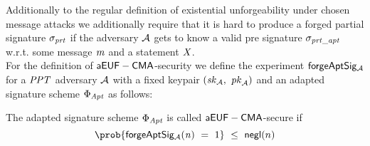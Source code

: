 \begin{definition}[$\cnstaEUFCMA$]\label{def:aeufcma}
Additionally to the regular definition of existential unforgeability under chosen message attacks we additionally require that it is hard to produce a forged partial signature $\sigma_{\mathit{prt}}$ if the
adversary $\mathcal{A}$ gets to know a valid pre signature $\sigma_{\mathit{prt\_apt}}$ w.r.t. some message $\mathit{m}$ and a statement $\mathit{X}$.\\
For the definition of $\cnstaEUFCMA$-security we define the experiment $\mathsf{forgeAptSig_{\mathcal{A}}}$ for a $\mathit{PPT}$ adversary $\mathcal{A}$ with a fixed keypair $(\mathit{sk}_{\mathcal{A}} ,~ \mathit{pk}_{\mathcal{A}})$ and an adapted signature scheme $\Phi_{\mathit{Apt}}$ as
follows:\\
\begin{center}
    \fbox{
        \begin{varwidth}{\textwidth}
            \procedure[linenumbering, syntaxhighlight=auto]{$\procExpForg{\varN}$} {
                \varSet \opAssign \cnstEmptySet \\
                (\varNonceAdv \opSeperate \varRandAdv) \opFunResult \procSetupPartSig{\varSecParam} \\
                \varMsg \opFunResult \cnstAdversary^{\procSignOracle{\cdot}{\varSecKey}{\varPubKey}}(\varPubKeyAdv \opSeperate \varRandAdv) \\
                \varSigPartApt \opFunResult \procGenPtAptSig{\varMsg}{\varSecKey}{\varNonce}{\varPubKeyAdv}{\varRandAdv}{\varWit} \\
                \varSigPart \opFunResult \cnstAdversary^{\procSignOracle{\cdot}{\varSecKey}{\varPubKey}}(\varSigPartApt) \\
                \varSigFin \opFunResult \procFinAptSig{\varSigPart}{\varSigPartApt}{\varWit}{\varRand}{\varRandAdv} \\
                \pcreturn (\varMsg \opNotIn \varSet \opAnd \procVerf{\varMsg}{\varSigFin}{\varPubKeyAdv \opAddPoint \varPubKey})
            }\\[2\baselineskip]
            \procedure[linenumbering, syntaxhighlight=auto]{$\procSignOracle{\varMsg}{\varPubKeyAdv}{\varRandAdv}$} {
                \varSet \opAssign \varSet \opUnion {\varMsg} \\
                ((\varNonce \opSeperate \varRand) \opSeperate (\varWit \opSeperate \varStatement)) \opFunResult \procSetupApt{\varSecParam} \\
                \pcreturn \procGenPtAptSig{\varMsg}{\varSecKey}{\varNonce}{\varPubKeyAdv}{\varRandAdv}{\varWit}
            }\\[2\baselineskip]
        \end{varwidth}
    }
\end{center}
The adapted signature scheme $\Phi_{\mathit{Apt}}$ is called $\cnstaEUFCMA$-secure if
\[ \prob{\procExpForg{\varN} \opEq 1} \opSmEq \funNegl{n} \]
\end{definition}

